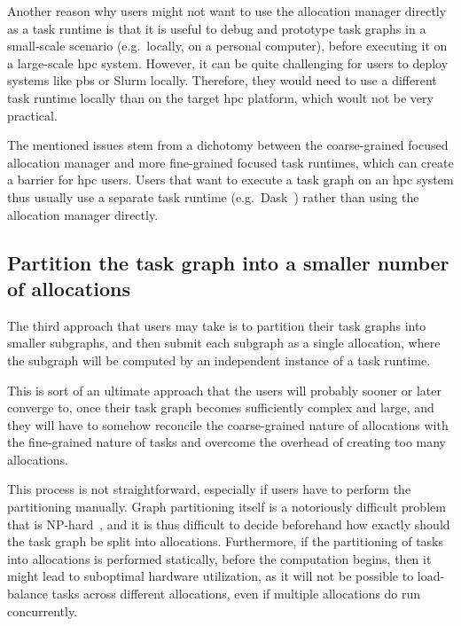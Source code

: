 Another reason why users might not want to use the allocation manager directly as a task runtime is
that it is useful to debug and prototype task graphs in a small-scale scenario (e.g.\ locally, on a
personal computer), before executing it on a large-scale \gls{hpc} system.
However, it can be quite challenging for users to deploy systems like \gls{pbs} or
Slurm locally. Therefore, they would need to use a different task runtime locally than on the
target \gls{hpc} platform, which woult not be very practical.

The mentioned issues stem from a dichotomy between the coarse-grained focused allocation manager
and more fine-grained focused task runtimes, which can create a barrier for
\gls{hpc} users. Users that want to execute a task graph on an
\gls{hpc} system thus usually use a separate task runtime (e.g.\
Dask~\cite{dask}) rather than using the allocation manager directly.

\subsection*{Partition the task graph into a smaller number of allocations}
The third approach that users may take is to partition their task graphs into smaller subgraphs,
and then submit each subgraph as a single allocation, where the subgraph will be computed by an
independent instance of a task runtime.

This is sort of an ultimate approach that the users will probably sooner or later converge to, once
their task graph becomes sufficiently complex and large, and they will have to somehow reconcile
the coarse-grained nature of allocations with the fine-grained nature of tasks and overcome the
overhead of creating too many allocations.

This process is not straightforward, especially if users have to perform the partitioning manually.
Graph partitioning itself is a notoriously difficult problem that is
NP-hard~\cite{graph_partitioning}\todo[inline]{Ada: Is this OK?}, and it is thus difficult to decide
beforehand how exactly should the task graph be split into allocations. Furthermore, if the
partitioning of tasks into allocations is performed statically, before the computation begins, then
it might lead to suboptimal hardware utilization, as it will not be possible to load-balance tasks
across different allocations, even if multiple allocations do run concurrently.

